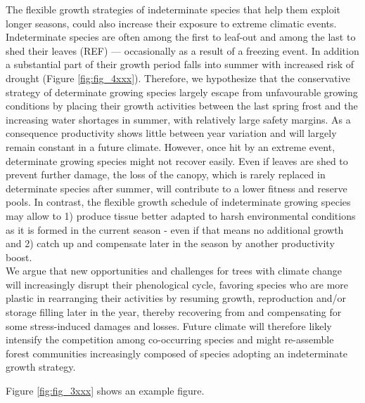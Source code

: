 \documentclass{article}
\begin{document}
The flexible growth strategies of indeterminate species that help them exploit longer seasons, could also increase their exposure to extreme climatic events. Indeterminate species are often among the first to leaf-out and among the last to shed their leaves (REF) --- occasionally as a result of a freezing event. In addition a substantial part of their growth period falls into summer with increased risk of drought (Figure \ref{fig:fig_4xxx}). Therefore, we hypothesize that the conservative strategy of determinate growing species largely escape from unfavourable growing conditions by placing their growth activities between the last spring frost and the increasing water shortages in summer, with relatively large safety margins. As a consequence productivity shows little between year variation and will largely remain constant in a future climate. However, once hit by an extreme event, determinate growing species might not recover easily. Even if leaves are shed to prevent further damage, the loss of the canopy, which is rarely replaced in determinate species after summer, will contribute to a lower fitness and reserve pools. In contrast, the flexible growth schedule of indeterminate growing species may allow to 1) produce tissue better adapted to harsh environmental conditions as it is formed in the current season - even if that means no additional growth and 2) catch up and compensate later in the season by another productivity boost. \\

We argue that new opportunities and challenges for trees with climate change will increasingly disrupt their phenological cycle, favoring species who are more plastic in rearranging their activities by resuming growth, reproduction and/or storage filling later in the year, thereby recovering from and compensating for some stress-induced damages and losses. Future climate will therefore likely intensify the competition among co-occurring species and might re-assemble forest communities increasingly composed of species adopting an indeterminate growth strategy.

			Figure \ref{fig:fig_3xxx} shows an example figure.
	
\end{document}

